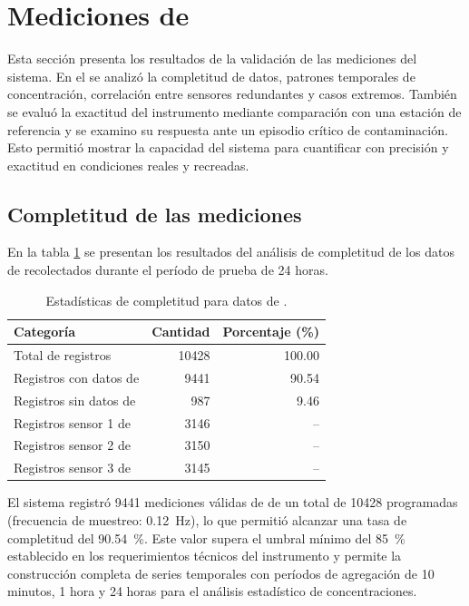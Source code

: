 																		
\newpage
\section{Mediciones de \MPF}

Esta sección presenta los resultados de la validación de las mediciones del sistema. En el se analizó la completitud de datos, patrones temporales de concentración, correlación entre sensores redundantes y casos extremos. También se evaluó la exactitud del instrumento mediante comparación con una estación de referencia y se examino su respuesta ante un episodio crítico de contaminación. Esto permitió mostrar la capacidad del sistema para cuantificar \MPF con precisión y exactitud en condiciones reales y recreadas.


\subsection{Completitud de las mediciones }

En la tabla \ref{tab:completitud_pm25} se presentan los resultados del análisis de completitud de los datos de \MPF recolectados durante el período de prueba de 24 horas.


\begin{table}[!hbp]
	\centering
	\caption{Estadísticas de completitud para datos de \MPF.}
	\begin{tabular}{lrr}
		\toprule
		\textbf{Categoría} & \textbf{Cantidad} & \textbf{Porcentaje (\%)} \\
		\midrule
		Total de registros & \num{10428} & \num{100,00} \\
		Registros con datos de \MPF & \num{9441} & \num{90,54} \\
		Registros sin datos de \MPF & \num{987} & \num{9,46} \\
		Registros sensor 1 de \MPF & \num{3146} & -- \\
		Registros sensor 2 de \MPF & \num{3150} & -- \\
		Registros sensor 3 de \MPF & \num{3145} & -- \\
		\bottomrule
	\end{tabular}
	\label{tab:completitud_pm25}
\end{table}

El sistema registró \num{9441} mediciones válidas de \MPF de un total de \num{10428} programadas (frecuencia de muestreo: \SI{0.12}{\hertz}), lo que permitió  alcanzar una tasa de completitud del \SI{90.54}{\percent}. Este valor supera el umbral mínimo del \SI{85}{\percent} establecido en los requerimientos técnicos del instrumento y permite la construcción completa de series temporales con períodos de agregación de 10 minutos, 1 hora y 24 horas para el análisis estadístico de concentraciones.

